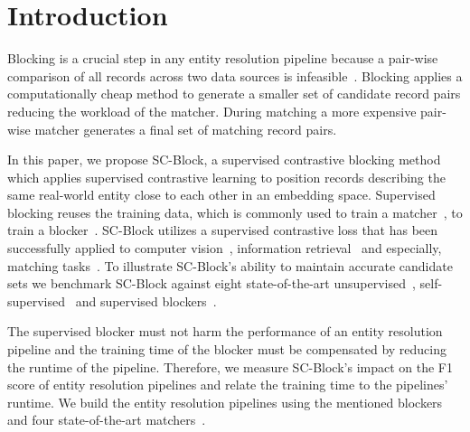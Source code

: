 \documentclass[sigconf,nonacm]{acmart}
\begin{document}
\maketitle

\section{Introduction}

Blocking is a crucial step in any entity resolution pipeline because a pair-wise comparison of all records across two data sources is infeasible~\cite{christen_data_2012, thirumuruganathan_deep_2021, papadakis_blocking_2021}.
Blocking applies a computationally cheap method to generate a smaller set of candidate record pairs reducing the workload of the matcher.
During matching a more expensive pair-wise matcher generates a final set of matching record pairs.

In this paper, we propose SC-Block, a supervised contrastive blocking method which applies supervised contrastive learning to position records describing the same real-world entity close to each other in an embedding space.
Supervised blocking reuses the training data, which is commonly used to train a matcher~\cite{li_deep_2020, konda_magellan_2016,peeters_supervised_2022}, to train a blocker~\cite{bilenko_adaptive_2006, zhang_autoblock_2020,papadakis_supervised_2014}.
SC-Block utilizes a supervised contrastive loss that has been successfully applied to computer vision~\cite{khosla_supervised_2020}, information retrieval~\cite{gao_simcse_2021} and especially, matching tasks~\cite{peeters_supervised_2022}.
To illustrate SC-Block's ability to maintain accurate candidate sets we benchmark SC-Block against eight state-of-the-art unsupervised~\cite{christen_survey_2012}, self-supervised~\cite{thirumuruganathan_deep_2021, wang_sudowoodo_2022, mugeni_graph-based_2022} and supervised blockers~\cite{zhang_autoblock_2020, papadakis_supervised_2014}. 

The supervised blocker must not harm the performance of an entity resolution pipeline and the training time of the blocker must be compensated by reducing the runtime of the pipeline.
Therefore, we measure SC-Block's impact on the F1 score of entity resolution pipelines and relate the training time to the pipelines' runtime.
We build the entity resolution pipelines using the mentioned blockers and four state-of-the-art matchers~\cite{konda_magellan_2016,brunner_entity_2020,li_deep_2020,peeters_supervised_2022}.
\end{document}
